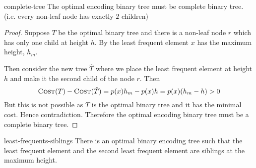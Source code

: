 \begin{lemma}{}{complete-tree}
	The optimal encoding binary tree must be complete binary tree. (i.e. every non-leaf node has exactly $2$ children)
\end{lemma}
\begin{proof}
	Suppose $T$ be the optimal binary tree and there is a non-leaf node $r$ which has only one child at height $h$. 
	By  the least frequent element $x$ has the maximum height, $h_m$. 
	
	 Then consider the new tree $\hat{T}$ where we place the least frequent element at height $h$ and make it the second child of the node $r$. Then $$\textsc{Cost}(T)-\textsc{Cost}(\hat{T})=p(x)h_m-p(x)h=p(x)(h_m-h)>0$$But this is not possible as $T$ is the optimal binary tree and it has the minimal cost. Hence contradiction. Therefore the optimal encoding binary tree must be a complete binary tree. 
\end{proof}
\begin{lemma}{}{least-frequents-siblings}
There is an optimal binary encoding tree such that the least frequent element and the second least frequent element are siblings at the maximum height.
\end{lemma}
